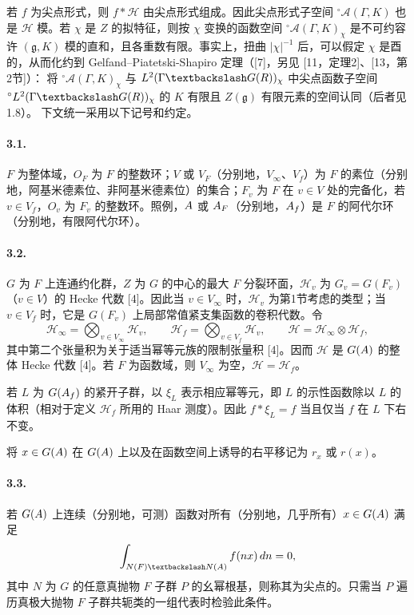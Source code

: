 若 $f$ 为尖点形式，则 $f*\mathcal H$ 由尖点形式组成。因此尖点形式子空间 $^\circ\mathcal A(\Gamma,K)$ 也是 $\mathcal H$ 模。若 $\chi$ 是 $Z$ 的拟特征，则按 $\chi$ 变换的函数空间 $^\circ\mathcal A(\Gamma,K)_\chi$ 是不可约容许 $(\mathfrak g,K)$ 模的直和，且各重数有限。事实上，扭曲 $|\chi|^{-1}$ 后，可以假定 $\chi$ 是酉的，从而化约到 Gelfand--Piatetski-Shapiro 定理（[7]，另见 [11，定理2]、[13，第2节]）：
将 $^\circ\mathcal A(\Gamma,K)_\chi$ 与 $L^2(\Gamma\backslash G(\R))_\chi$ 中尖点函数子空间 $^\circ L^2(\Gamma\backslash G(\R))_\chi$ 的 $K$ 有限且 $Z(\mathfrak g)$ 有限元素的空间认同（后者见1.8）。
下文统一采用以下记号和约定。
\paragraph*{3.1.}
$F$ 为整体域，$O_F$ 为 $F$ 的整数环；$V$ 或 $V_F$（分别地，$V_\infty$、$V_f$）为 $F$ 的素位（分别地，阿基米德素位、非阿基米德素位）的集合；$F_v$ 为 $F$ 在 $v\in V$ 处的完备化，若 $v\in V_f$，$O_v$ 为 $F_v$ 的整数环。照例，$A$ 或 $A_F$（分别地，$A_f$）是 $F$ 的阿代尔环（分别地，有限阿代尔环）。
\paragraph*{3.2.}
$G$ 为 $F$ 上连通约化群，$Z$ 为 $G$ 的中心的最大 $F$ 分裂环面，$\mathcal H_v$ 为 $G_v=G(F_v)$（$v\in V$）的 Hecke 代数 [4]。因此当 $v\in V_\infty$ 时，$\mathcal H_v$ 为第1节考虑的类型；当 $v\in V_f$ 时，它是 $G(F_v)$ 上局部常值紧支集函数的卷积代数。令
\[
\mathcal H_\infty=\bigotimes_{v\in V_\infty}\mathcal H_v,\qquad
\mathcal H_f=\bigotimes_{v\in V_f}\mathcal H_v,\qquad
\mathcal H=\mathcal H_\infty\otimes\mathcal H_f,\tag{1}
\]
其中第二个张量积为关于适当幂等元族的限制张量积 [4]。因而 $\mathcal H$ 是 $G(A)$ 的整体 Hecke 代数 [4]。若 $F$ 为函数域，则 $V_\infty$ 为空，$\mathcal H=\mathcal H_f$。

若 $L$ 为 $G(A_f)$ 的紧开子群，以 $\xi_L$ 表示相应幂等元，即 $L$ 的示性函数除以 $L$ 的体积（相对于定义 $\mathcal H_f$ 所用的 Haar 测度）。因此 $f*\xi_L=f$ 当且仅当 $f$ 在 $L$ 下右不变。

将 $x\in G(A)$ 在 $G(A)$ 上以及在函数空间上诱导的右平移记为 $r_x$ 或 $r(x)$。
\paragraph*{3.3.}
若 $G(A)$ 上连续（分别地，可测）函数对所有（分别地，几乎所有）$x\in G(A)$ 满足
\[
\int_{N(F)\backslash N(\A)}f(nx)\,dn=0,
\]
其中 $N$ 为 $G$ 的任意真抛物 $F$ 子群 $P$ 的幺幂根基，则称其为尖点的。只需当 $P$ 遍历真极大抛物 $F$ 子群共轭类的一组代表时检验此条件。
